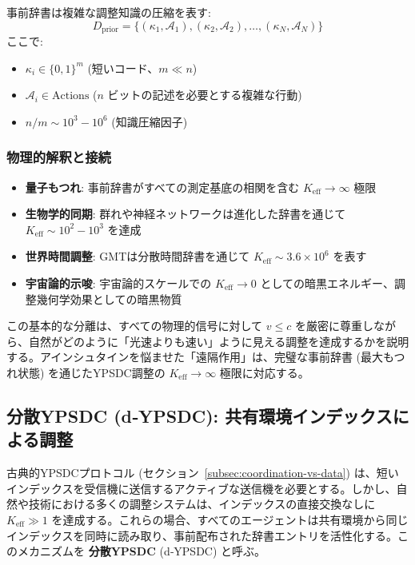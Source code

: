 \documentclass[11pt,a4paper]{article}
\begin{document}
	事前辞書は複雑な調整知識の圧縮を表す:
	\begin{equation}
		D_{\text{prior}} = \{(\kappa_1, \mathcal{A}_1), (\kappa_2, \mathcal{A}_2), \dots, (\kappa_N, \mathcal{A}_N)\}
	\end{equation}
	ここで:
	\begin{itemize}
		\item $\kappa_i \in \{0,1\}^m$ (短いコード、$m \ll n$)
		\item $\mathcal{A}_i \in \text{Actions}$ ($n$ ビットの記述を必要とする複雑な行動)
		\item $n/m \sim 10^3-10^6$ (知識圧縮因子)
	\end{itemize}
	
	\subsubsection{物理的解釈と接続}
	
	\begin{itemize}
		\item \textbf{量子もつれ}: 事前辞書がすべての測定基底の相関を含む $K_{\mathrm{eff}} \to \infty$ 極限
		\item \textbf{生物学的同期}: 群れや神経ネットワークは進化した辞書を通じて $K_{\mathrm{eff}} \sim 10^2-10^3$ を達成
		\item \textbf{世界時間調整}: GMTは分散時間辞書を通じて $K_{\mathrm{eff}} \sim 3.6\times10^6$ を表す
		\item \textbf{宇宙論的示唆}: 宇宙論的スケールでの $K_{\mathrm{eff}} \to 0$ としての暗黒エネルギー、調整幾何学効果としての暗黒物質
	\end{itemize}
	
	この基本的な分離は、すべての物理的信号に対して $v \leq c$ を厳密に尊重しながら、自然がどのように「光速よりも速い」ように見える調整を達成するかを説明する。アインシュタインを悩ませた「遠隔作用」は、完璧な事前辞書 (最大もつれ状態) を通じたYPSDC調整の $K_{\mathrm{eff}} \to \infty$ 極限に対応する。
	
	\subsection{分散YPSDC (d‑YPSDC): 共有環境インデックスによる調整}
	\label{subsec:d-ypsdc}
	
	古典的YPSDCプロトコル (セクション~\ref{subsec:coordination-vs-data}) は、短いインデックスを受信機に送信するアクティブな送信機を必要とする。しかし、自然や技術における多くの調整システムは、インデックスの直接交換なしに $K_{\mathrm{eff}} \gg 1$ を達成する。これらの場合、すべてのエージェントは共有環境から同じインデックスを同時に読み取り、事前配布された辞書エントリを活性化する。このメカニズムを \textbf{分散YPSDC} (d‑YPSDC) と呼ぶ。
	
\end{document}
